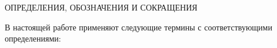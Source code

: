 \begin{center}
	ОПРЕДЕЛЕНИЯ, ОБОЗНАЧЕНИЯ И СОКРАЩЕНИЯ
\end{center}

В настоящей работе применяют следующие термины с соответствующими определениями:

\newpage